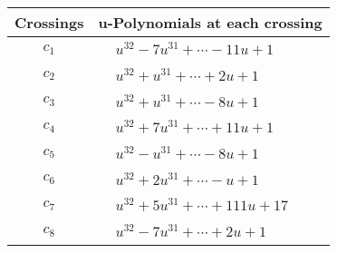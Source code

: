 \documentclass[1p]{elsarticle_modified}
\theoremstyle{definition}
\begin{document}
\begin{tabular}{m{50pt}|m{274pt}}
Crossings & \hspace{64pt}u-Polynomials at each crossing \\
\hline $$\begin{aligned}c_{1}\end{aligned}$$&$\begin{aligned}
&u^{32}-7 u^{31}+\cdots-11 u+1
\end{aligned}$\\
\hline $$\begin{aligned}c_{2}\end{aligned}$$&$\begin{aligned}
&u^{32}+u^{31}+\cdots+2 u+1
\end{aligned}$\\
\hline $$\begin{aligned}c_{3}\end{aligned}$$&$\begin{aligned}
&u^{32}+u^{31}+\cdots-8 u+1
\end{aligned}$\\
\hline $$\begin{aligned}c_{4}\end{aligned}$$&$\begin{aligned}
&u^{32}+7 u^{31}+\cdots+11 u+1
\end{aligned}$\\
\hline $$\begin{aligned}c_{5}\end{aligned}$$&$\begin{aligned}
&u^{32}- u^{31}+\cdots-8 u+1
\end{aligned}$\\
\hline $$\begin{aligned}c_{6}\end{aligned}$$&$\begin{aligned}
&u^{32}+2 u^{31}+\cdots- u+1
\end{aligned}$\\
\hline $$\begin{aligned}c_{7}\end{aligned}$$&$\begin{aligned}
&u^{32}+5 u^{31}+\cdots+111 u+17
\end{aligned}$\\
\hline $$\begin{aligned}c_{8}\end{aligned}$$&$\begin{aligned}
&u^{32}-7 u^{31}+\cdots+2 u+1
\end{aligned}$\\

\end{tabular}
\end{document}

